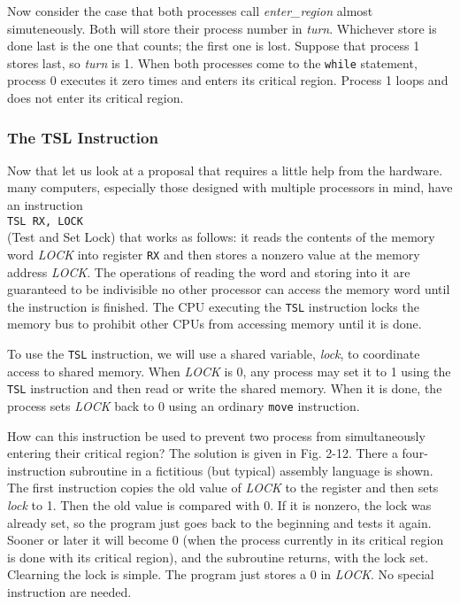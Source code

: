 \documentclass{book}
\newcommand {\sys} [1] {\textsl{#1}}
\newcommand {\cmd} [1] {\texttt{#1}}
\begin{document}
Now consider the case that both processes call \sys{enter\_region} almost simuteneously.
Both will store their process number in \sys{turn}.
Whichever store is done last is the one that counts; the first one is lost.
Suppose that process 1 stores last, so \sys{turn} is 1.
When both processes come to the \cmd{while} statement, process 0 executes it zero times and enters its critical region.
Process 1 loops and does not enter its critical region.

\subsubsection*{The TSL Instruction}
Now that let us look at a proposal that requires a little help from the hardware.
many computers, especially those designed with multiple processors in mind, have an instruction\\
\cmd{TSL RX, LOCK}\\
(Test and Set Lock) that works as follows: 
it reads the contents of the memory word \sys{LOCK} into register \cmd{RX} 
and then stores a nonzero value at the memory address \sys{LOCK}.
The operations of reading the word and storing into it are guaranteed to be indivisible
no other processor can access the memory word until the instruction is finished.
The CPU executing the \cmd{TSL} instruction locks the memory bus to prohibit other CPUs from accessing memory until it is done.
 
To use the \cmd{TSL} instruction, we will use a shared variable, \sys{lock}, to coordinate access to shared memory.
When \sys{LOCK} is 0, any process may set it to 1 using the \cmd{TSL} instruction and then read or write the shared memory.
When it is done, the process sets \sys{LOCK} back to 0 using an ordinary \cmd{move} instruction.

How can this instruction be used to prevent two process from simultaneously entering their critical region?
The solution is given in Fig. 2-12.
There a four-instruction subroutine in a fictitious (but typical) assembly language is shown.
The first instruction copies the old value of \sys{LOCK} to the register and then sets \sys{lock} to 1.
Then the old value is compared with 0.
If it is nonzero, the lock was already set, so the program just goes back to the beginning and tests it again.
Sooner or later it will become 0 (when the process currently in its critical region is done with its critical region),
and the subroutine returns, with the lock set.
Clearning the lock is simple.
The program just stores a 0 in \sys{LOCK}.
No special instruction are needed.
\end{document}
